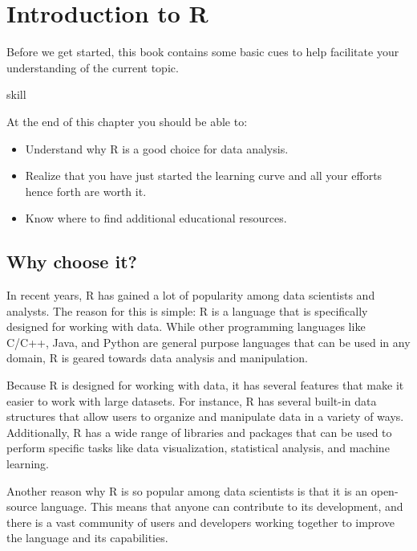 \documentclass[
]{book}
\begin{document}
\hypertarget{introduction-to-r}{%
\chapter{Introduction to R}\label{introduction-to-r}}

Before we get started, this book contains some basic cues to help facilitate your understanding of the current topic.

\begin{infobox}{skill}

At the end of this chapter you should be able to:

\begin{itemize}
\item
  Understand why R is a good choice for data analysis.
\item
  Realize that you have just started the learning curve and all your efforts hence forth are worth it.
\item
  Know where to find additional educational resources.
\end{itemize}

\end{infobox}

\hypertarget{why-choose-it}{%
\section*{Why choose it?}\label{why-choose-it}}

In recent years, R has gained a lot of popularity among data scientists and analysts. The reason for this is simple: R is a language that is specifically designed for working with data. While other programming languages like C/C++, Java, and Python are general purpose languages that can be used in any domain, R is geared towards data analysis and manipulation.

Because R is designed for working with data, it has several features that make it easier to work with large datasets. For instance, R has several built-in data structures that allow users to organize and manipulate data in a variety of ways. Additionally, R has a wide range of libraries and packages that can be used to perform specific tasks like data visualization, statistical analysis, and machine learning.

Another reason why R is so popular among data scientists is that it is an open-source language. This means that anyone can contribute to its development, and there is a vast community of users and developers working together to improve the language and its capabilities.
\end{document}
